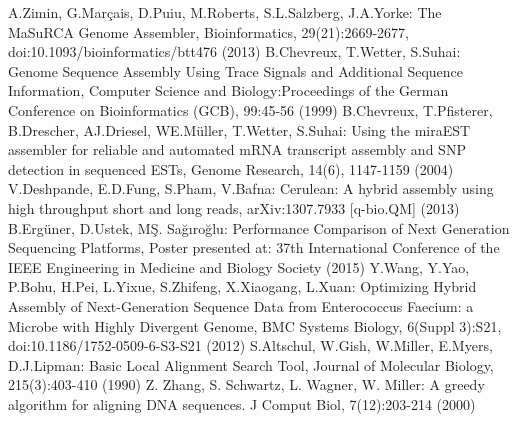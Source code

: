 \documentclass{llncs}
\begin{document}
\begin{thebibliography}{}
 A.Zimin, G.Mar\c{c}ais, D.Puiu, M.Roberts, S.L.Salzberg, J.A.Yorke: The MaSuRCA Genome Assembler, Bioinformatics, {29(21)}:2669-2677, doi:10.1093/bioinformatics/btt476 (2013)
 B.Chevreux, T.Wetter, S.Suhai:  Genome Sequence Assembly Using Trace Signals and Additional Sequence Information, Computer Science and Biology:Proceedings of the German Conference on Bioinformatics (GCB), {99}:45-56 (1999)
 B.Chevreux, T.Pfisterer, B.Drescher, AJ.Driesel, WE.Müller, T.Wetter, S.Suhai: Using the miraEST assembler for reliable and automated mRNA transcript assembly and SNP detection in sequenced ESTs, Genome Research, 14(6), 1147-1159 (2004)
 V.Deshpande, E.D.Fung, S.Pham, V.Bafna: Cerulean: A hybrid assembly using high throughput short and long reads, arXiv:1307.7933 [q-bio.QM] (2013)
 B.Ergüner, D.Ustek, MŞ. Sağıroğlu: Performance Comparison of Next Generation Sequencing Platforms, Poster presented at: 37th International Conference of the IEEE Engineering in Medicine and Biology Society (2015)
 Y.Wang, Y.Yao, P.Bohu, H.Pei, L.Yixue, S.Zhifeng, X.Xiaogang, L.Xuan: Optimizing Hybrid Assembly of Next-Generation Sequence Data from Enterococcus Faecium: a Microbe with Highly Divergent Genome, BMC Systems Biology, {6(Suppl 3)}:S21, doi:10.1186/1752-0509-6-S3-S21 (2012)
 S.Altschul, W.Gish, W.Miller, E.Myers, D.J.Lipman: Basic Local Alignment Search Tool, Journal of Molecular Biology, {215(3)}:403-410 (1990)
 Z. Zhang, S. Schwartz, L. Wagner, W. Miller: A greedy algorithm for aligning {DNA} sequences. J Comput Biol, 7(12):203-214 (2000)



\end{thebibliography}
\clearpage
{} %
\renewcommand{\indexname}{Author Index}
\printindex
\clearpage
{} %
\renewcommand{\indexname}{Subject Index}
%
\end{document}
